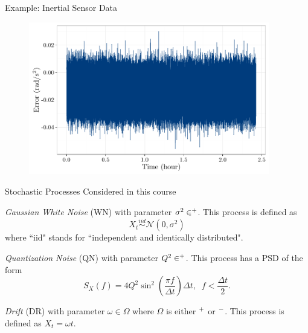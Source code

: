 \documentclass[envcountsect,usenames,dvipsnames]{beamer}
\theoremstyle{mystyle}
\begin{document}
\begin{frame}{Example: Inertial Sensor Data}
	
	\begin{figure}
	    \centering
	  \includegraphics[width = 10.5cm]{Images/imu}
	\end{figure}	
	
\end{frame}

\begin{frame}{Stochastic Processes Considered in this course}
\footnotesize
\begin{Definition}
    \emph{Gaussian White Noise} (WN) with parameter $\sigma^2 \in \real^+$. This process is defined as
	\begin{equation*}
		X_t  \overset{iid}{\sim} \mathcal{N}\left(0, \sigma^2 \right)
	\end{equation*}
    \label{def.WN}
    where ``iid" stands for ``independent and identically distributed". 
\end{Definition}

\begin{Definition}
    \emph{Quantization Noise} (QN) with parameter $Q^2 \in \real^+$. This process has a PSD of the form
	\begin{equation*}
		S_{X}(f) = 4 Q^2 \sin^2 \left( \frac{\pi f}{\Delta t} \right) \Delta t, \;\; f < \frac{\Delta t}{2}.
	\end{equation*} 
	\label{def.QN}
\end{Definition}

    \begin{Definition}[Drift]
\emph{Drift} (DR) with parameter $\omega \in \Omega$ where $\Omega$ is either $\real^+$ or $\real^-$. This process is defined as $X_t = \omega t$.
\label{def.drift}
\end{Definition}

\end{frame}
\end{document}
